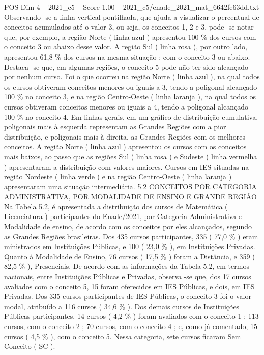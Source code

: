 \begin{textsample}{POS Dim 4 – 2021\_c5 – Score 1.00 – 2021\_c5/enade\_2021\_mat\_6642fe63dd.txt}
Observando -se a linha vertical pontilhada, que ajuda a visualizar o percentual de conceitos acumulados até o valor 3, ou seja, os conceitos 1, 2 e 3, pode -se notar que, por exemplo, a região Norte ( linha azul ) apresentou 100 \% dos cursos com o conceito 3 ou abaixo desse valor.
A região Sul ( linha rosa ), por outro lado, apresentou 61,8 \% dos cursos na mesma situação : com o conceito 3 ou abaixo.
Destaca -se que, em algumas regiões, o conceito 5 pode não ter sido alcançado por nenhum curso.
Foi o que ocorreu na região Norte ( linha azul ), na qual todos os cursos obtiveram conceitos menores ou iguais a 3, tendo a poligonal alcançado 100 \% no conceito 3, e na região Centro-Oeste ( linha laranja ), na qual todos os cursos obtiveram conceitos menores ou iguais a 4, tendo a poligonal alcançado 100 \% no conceito 4.
Em linhas gerais, em um gráfico de distribuição cumulativa, poligonais mais à esquerda representam as Grandes Regiões com a pior distribuição, e poligonais mais à direita, as Grandes Regiões com os melhores conceitos.
A região Norte ( linha azul ) apresentou os cursos com os conceitos mais baixos, ao passo que as regiões Sul ( linha rosa ) e Sudeste ( linha vermelha ) apresentaram a distribuição com valores maiores.
Cursos em IES situadas na região Nordeste ( linha verde ) e na região Centro-Oeste ( linha laranja ) apresentaram uma situação intermediária. 5.2 CONCEITOS POR CATEGORIA ADMINISTRATIVA, POR MODALIDADE DE ENSINO E GRANDE REGIÃO Na Tabela 5.2, é apresentada a distribuição dos cursos de Matemática ( Licenciatura ) participantes do Enade/2021, por Categoria Administrativa e Modalidade de ensino, de acordo com os conceitos por eles alcançados, segundo as Grandes Regiões brasileiras.
Dos 435 cursos participantes, 335 ( 77,0 \% ) eram ministrados em Instituições Públicas, e 100 ( 23,0 \% ), em Instituições Privadas.
Quanto à Modalidade de Ensino, 76 cursos ( 17,5 \% ) foram a Distância, e 359 ( 82,5 \% ), Presenciais.
De acordo com as informações da Tabela 5.2, em termos nacionais, entre Instituições Públicas e Privadas, observa -se que, dos 17 cursos avaliados com o conceito 5, 15 foram oferecidos em IES Públicas, e dois, em IES Privadas.
Dos 335 cursos participantes de IES Públicas, o conceito 3 foi o valor modal, atribuído a 116 cursos ( 34,6 \% ).
Dos demais cursos de Instituições Públicas participantes, 14 cursos ( 4,2 \% ) foram avaliados com o conceito 1 ; 113 cursos, com o conceito 2 ; 70 cursos, com o conceito 4 ; e, como já comentado, 15 cursos ( 4,5 \% ), com o conceito 5.
Nessa categoria, sete cursos ficaram Sem Conceito ( SC ).

\end{textsample}
